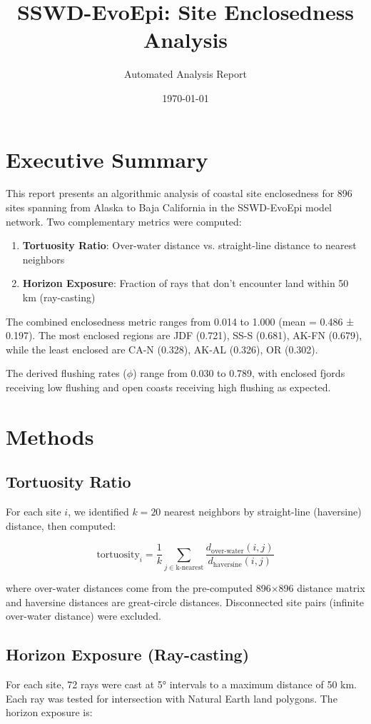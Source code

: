 \documentclass[11pt]{article}
\title{SSWD-EvoEpi: Site Enclosedness Analysis}
\author{Automated Analysis Report}
\date{\today}
\begin{document}
\maketitle

\section{Executive Summary}

This report presents an algorithmic analysis of coastal site enclosedness for 896 sites spanning from Alaska to Baja California in the SSWD-EvoEpi model network. Two complementary metrics were computed:

\begin{enumerate}
    \item \textbf{Tortuosity Ratio}: Over-water distance vs. straight-line distance to nearest neighbors
    \item \textbf{Horizon Exposure}: Fraction of rays that don't encounter land within 50 km (ray-casting)
\end{enumerate}

The combined enclosedness metric ranges from 0.014 to 1.000 (mean = 0.486 ± 0.197). The most enclosed regions are JDF (0.721), SS-S (0.681), AK-FN (0.679), while the least enclosed are CA-N (0.328), AK-AL (0.326), OR (0.302).

The derived flushing rates ($\phi$) range from 0.030 to 0.789, with enclosed fjords receiving low flushing and open coasts receiving high flushing as expected.

\section{Methods}

\subsection{Tortuosity Ratio}
For each site $i$, we identified $k=20$ nearest neighbors by straight-line (haversine) distance, then computed:

$$\text{tortuosity}_i = \frac{1}{k} \sum_{j \in \text{k-nearest}} \frac{d_{\text{over-water}}(i,j)}{d_{\text{haversine}}(i,j)}$$

where over-water distances come from the pre-computed 896×896 distance matrix and haversine distances are great-circle distances. Disconnected site pairs (infinite over-water distance) were excluded.

\subsection{Horizon Exposure (Ray-casting)}
For each site, 72 rays were cast at 5° intervals to a maximum distance of 50 km. Each ray was tested for intersection with Natural Earth land polygons. The horizon exposure is:
\end{document}
